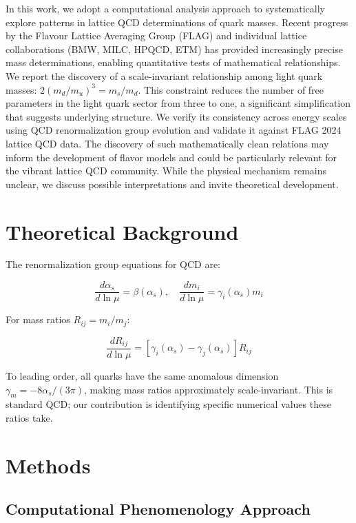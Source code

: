 \documentclass[12pt]{article}
\begin{document}
In this work, we adopt a computational analysis approach to systematically explore patterns in lattice QCD determinations of quark masses. Recent progress by the Flavour Lattice Averaging Group (FLAG) and individual lattice collaborations (BMW, MILC, HPQCD, ETM) has provided increasingly precise mass determinations, enabling quantitative tests of mathematical relationships. We report the discovery of a scale-invariant relationship among light quark masses: $2(m_d/m_u)^3 = m_s/m_d$. This constraint reduces the number of free parameters in the light quark sector from three to one, a significant simplification that suggests underlying structure. We verify its consistency across energy scales using QCD renormalization group evolution and validate it against FLAG 2024 lattice QCD data. The discovery of such mathematically clean relations may inform the development of flavor models and could be particularly relevant for the vibrant lattice QCD community. While the physical mechanism remains unclear, we discuss possible interpretations and invite theoretical development.

\section{Theoretical Background}

The renormalization group equations for QCD are:

\begin{equation}
\frac{d\alpha_s}{d\ln\mu} = \beta(\alpha_s),\quad \frac{dm_i}{d\ln\mu} = \gamma_i(\alpha_s)m_i
\end{equation}

For mass ratios $R_{ij} = m_i/m_j$:

\begin{equation}
\frac{dR_{ij}}{d\ln\mu} = [\gamma_i(\alpha_s) - \gamma_j(\alpha_s)]R_{ij}
\end{equation}

To leading order, all quarks have the same anomalous dimension $\gamma_m = -8\alpha_s/(3\pi)$, making mass ratios approximately scale-invariant. This is standard QCD; our contribution is identifying specific numerical values these ratios take.

\section{Methods}

\subsection{Computational Phenomenology Approach}
\end{document}
